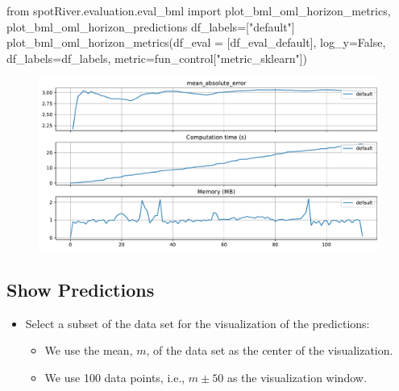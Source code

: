 \documentclass[
  letterpaper,
  DIV=11,
  numbers=noendperiod]{scrreprt}
\newenvironment{Shaded}{\begin{snugshade}}{\end{snugshade}}
\newcommand{\ImportTok}[1]{\textcolor[rgb]{0.00,0.46,0.62}{#1}}
\newcommand{\NormalTok}[1]{\textcolor[rgb]{0.00,0.23,0.31}{#1}}
\newcommand{\OperatorTok}[1]{\textcolor[rgb]{0.37,0.37,0.37}{#1}}
\newcommand{\StringTok}[1]{\textcolor[rgb]{0.13,0.47,0.30}{#1}}
\newcommand{\VariableTok}[1]{\textcolor[rgb]{0.07,0.07,0.07}{#1}}
\providecommand{\tightlist}{%
  \setlength{\itemsep}{0pt}\setlength{\parskip}{0pt}}\usepackage{longtable,booktabs,array}
\begin{document}
\begin{Shaded}
\begin{Highlighting}[]
\ImportTok{from}\NormalTok{ spotRiver.evaluation.eval\_bml }\ImportTok{import}\NormalTok{ plot\_bml\_oml\_horizon\_metrics, plot\_bml\_oml\_horizon\_predictions}
\NormalTok{df\_labels}\OperatorTok{=}\NormalTok{[}\StringTok{"default"}\NormalTok{]}
\NormalTok{plot\_bml\_oml\_horizon\_metrics(df\_eval }\OperatorTok{=}\NormalTok{ [df\_eval\_default], log\_y}\OperatorTok{=}\VariableTok{False}\NormalTok{, df\_labels}\OperatorTok{=}\NormalTok{df\_labels, metric}\OperatorTok{=}\NormalTok{fun\_control[}\StringTok{"metric\_sklearn"}\NormalTok{])}
\end{Highlighting}
\end{Shaded}

\begin{figure}[H]

{\centering \includegraphics{13_spot_hpt_river_files/figure-pdf/cell-29-output-1.pdf}

}

\end{figure}

\hypertarget{show-predictions}{%
\subsection{Show Predictions}\label{show-predictions}}

\begin{itemize}
\tightlist
\item
  Select a subset of the data set for the visualization of the
  predictions:

  \begin{itemize}
  \tightlist
  \item
    We use the mean, \(m\), of the data set as the center of the
    visualization.
  \item
    We use 100 data points, i.e., \(m \pm 50\) as the visualization
    window.
  \end{itemize}
\end{itemize}
\end{document}
